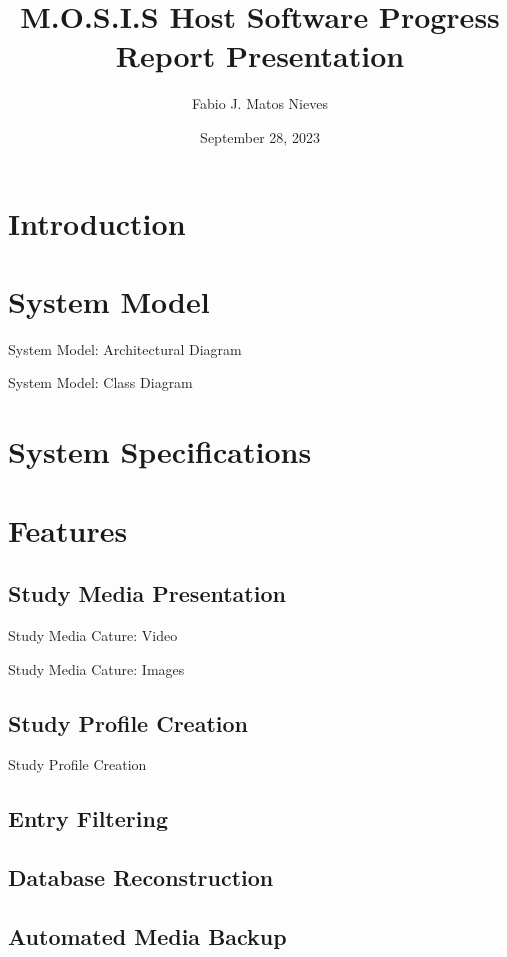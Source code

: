 \documentclass[17pt, aspectratio=169]{beamer}
\title{M.O.S.I.S Host Software Progress Report Presentation}
\author[Fabio J. Matos Nieves]{Fabio J. Matos Nieves}
\institute[UPRM]{University of Puerto Rico Mayagüez Campus}
\date{September 28, 2023}
\begin{document}
\begin{frame}
	\maketitle
\end{frame}
\begin{frame}
	\tableofcontents
\end{frame}
\section{Introduction}
\section{System Model}
\begin{frame}{System Model: Architectural Diagram}
 
\end{frame}
\begin{frame}{System Model: Class Diagram}
 
\end{frame}
\section{System Specifications}
\section{Features}
\subsection{Study Media Presentation}
\begin{frame}{Study Media Cature: Video}
 
\end{frame}
\begin{frame}{Study Media Cature: Images}
 
\end{frame}
\subsection{Study Profile Creation}
\begin{frame}{Study Profile Creation}
\end{frame}
\subsection{Entry Filtering}
\subsection{Database Reconstruction}
\subsection{Automated Media Backup}
\end{document}

